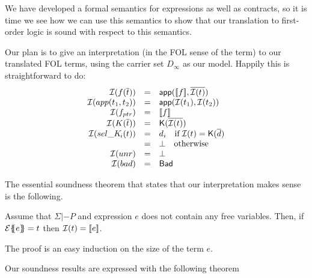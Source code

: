 We have developed a formal semantics for expressions as well as contracts, so it is time we 
see how we can use this semantics to show that our translation to first-order logic is sound 
with respect to this semantics. 

Our plan is to give an interpretation (in the FOL sense of the term) to our 
translated FOL terms, using the carrier set $D_\infty$ as our model. 
Happily this is straightforward to do:
\[\begin{array}{rcl}
   {\cal I}(f(\overline{t})) & = & \mathsf{app}([\![f]\!],\overline{{\cal I}(t)}) \\ 
   {\cal I}(app(t_1,t_2))     & = & \mathsf{app}({\cal I}(t_1), {\cal I}(t_2)) \\
   {\cal I}(f_{ptr})  & = & [\![f]\!] \\
   {\cal I}(K(\overline{t})) & = & \mathsf{K}(\overline{{\cal I}(t)}) \\ 
   {\cal I}(\mathop{sel\_K\!_{i}}(t)) & = &  d_i \quad \mbox{if}\; {\cal I}(t) = \mathsf{K}(\overline{d}) \\ 
                           & = & \bot \quad \mbox{otherwise} \\
  {\cal I}(unr)       & = & \bot \\
  {\cal I}(bad)       & = & \mathsf{Bad}
\end{array}\]

The essential soundness theorem that states that our interpretation makes sense is
the following. 
\begin{theorem}\label{thm:interp-respect}
Assume that $\Sigma |- P$ and expression $e$ does not contain any free variables. 
Then, if ${\cal E}\{\!\!\{e\}\!\!\} = t$ then ${\cal I}(t) = [\![e]\!]$.
\end{theorem}
The proof is an easy induction on the size of the term $e$.

Our soundness results are expressed with the following theorem 

